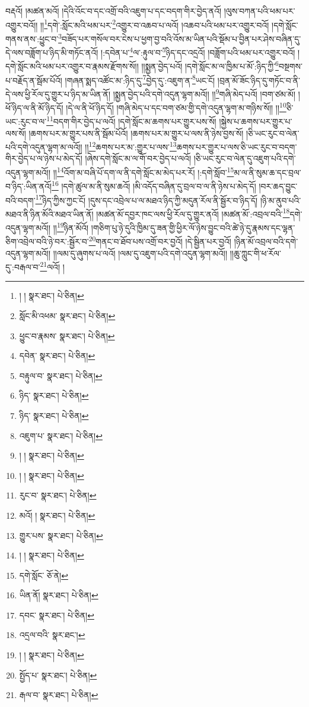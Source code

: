 བརྡའོ། །མཚན་མའོ། །དེའི་འོང་བ་དང་འགྲོ་བའི་འཇུག་པ་དང་བདག་གིར་བྱེད་ནའོ། །ལུས་བཀན་པའི་ཕམ་པར་འགྱུར་བའོ།། །།\footnote{། །  སྣར་ཐང་།  པེ་ཅིན། }དགེ་:སློང་མའི་ཕམ་པར་\footnote{སློང་མི་འཕམ་  སྣར་ཐང་།  པེ་ཅིན། }འགྱུར་བ་འཆབ་པ་ལའོ། །འཆབ་པའི་ཕམ་པར་འགྱུར་བའོ། །དགེ་སློང་གནས་ནས་:ཕྱུང་བ་\footnote{ཕྱུང་བ་རྣམས་  སྣར་ཐང་།  པེ་ཅིན། }བཟོད་པར་གསོལ་བར་ངེས་པ་ཕྱག་བྱ་བའི་འོས་མ་ཡིན་པའི་སྡོམ་པ་བྱིན་པར་ཤེས་བཞིན་དུ་དེ་ལས་བཟློག་པ་ཉིད་མི་གཏོང་ནའོ། །:དབེན་པ་\footnote{དབེན་  སྣར་ཐང་།  པེ་ཅིན། }ལ་:རྟུལ་བ་\footnote{བརྟུལ་བ་  སྣར་ཐང་།  པེ་ཅིན། }ཉིད་དང་འདྲའོ། །བཟློག་པའི་ཕམ་པར་འགྱུར་བའོ། །དགེ་སློང་མའི་ཕམ་པར་འགྱུར་བ་རྣམས་རྫོགས་སོ།། །།སྨྱན་བྱེད་པའོ། །དགེ་སློང་མ་ལ་ཁྱིམ་པ་མོ་:ཉིད་ཀྱི་\footnote{ཉིད་  སྣར་ཐང་།  པེ་ཅིན། }བསྔགས་པ་བརྗོད་ན་སྦོམ་པོའོ། །གཞན་སྨད་འཚོང་མ་:ཉིད་དུ་\footnote{ཉིད་  སྣར་ཐང་།  པེ་ཅིན། }བྱེད་དུ་:འཇུག་ན་\footnote{འཇུག་པ་  སྣར་ཐང་།  པེ་ཅིན། }ཡང་ངོ། །བྲན་མོ་ཟོང་ཉིད་དུ་གཏོང་བ་ནི་དེ་ལས་ཕྱི་རོལ་དུ་གྱུར་པ་ཉིད་མ་ཡིན་ནོ། །སྨྱན་བྱེད་པའི་དགེ་འདུན་ལྷག་མའོ།། །།\footnote{། །  སྣར་ཐང་།  པེ་ཅིན། }གཞི་མེད་པའོ། །བག་ཙམ་མོ། །ཕོ་ཉིད་ལ་ནི་མོ་ཉིད་དོ། །དེ་ལ་ནི་ཕོ་ཉིད་དོ། །གཞི་མེད་པ་དང་བག་ཙམ་གྱི་དགེ་འདུན་ལྷག་མ་གཉིས་སོ།། །།\footnote{། །  སྣར་ཐང་།  པེ་ཅིན། }ཅི་ཡང་:རུང་བ་ལ་\footnote{རུང་བ་  སྣར་ཐང་།  པེ་ཅིན། }བདག་གིར་བྱེད་པ་ལའོ། །དགེ་སློང་མ་ཆགས་པར་གྱུར་པས་སོ། །སྐྱེས་པ་ཆགས་པར་གྱུར་པ་ལས་སོ། །ཆགས་པར་མ་གྱུར་པས་ནི་སྦོམ་པོའོ། །ཆགས་པར་མ་གྱུར་པ་ལས་ནི་ཉེས་བྱས་སོ། །ཅི་ཡང་རུང་བ་ལེན་པའི་དགེ་འདུན་ལྷག་མ་ལའོ།། །།\footnote{མའོ། །  སྣར་ཐང་།  པེ་ཅིན། }ཆགས་པར་མ་:གྱུར་པ་ལས་\footnote{གྱུར་པས་  སྣར་ཐང་།  པེ་ཅིན། }ཆགས་པར་གྱུར་པ་ལས་ཅི་ཡང་རུང་བ་བདག་གིར་བྱེད་པ་ལ་ཉེས་པ་མེད་དོ། །ཞེས་དགེ་སློང་མ་ལ་གོ་བར་བྱེད་པ་ལའོ། །ཅི་ཡང་རུང་བ་ལེན་དུ་འཇུག་པའི་དགེ་འདུན་ལྷག་མའོ།། །།\footnote{། །  སྣར་ཐང་།  པེ་ཅིན། }འོག་མ་བཞི་པོ་དག་ལ་ནི་དགེ་སློང་མ་མེད་པར་རོ། །:དགེ་སློབ་\footnote{དགེ་སློང་  ཅོ་ནེ། }མ་ལ་ནི་སུམ་ཆ་དང་བྲལ་བ་ཉིད་:ཡིན་ནའོ།\footnote{ཡིན་ནོ།  སྣར་ཐང་།  པེ་ཅིན། } །དགེ་ཚུལ་མ་ནི་སུམ་ཆའོ། །མི་འདོད་བཞིན་དུ་བྲལ་བ་ལ་ནི་ཉེས་པ་མེད་དོ། །བར་ཆད་བྱུང་བའི་བདག་\footnote{དབང་  སྣར་ཐང་།  པེ་ཅིན། }ཉིད་ཀྱིས་ཀྱང་ངོ། །དུས་དང་འབྲེལ་པ་ལ་མཐའ་ཉིད་ཀྱི་མདུན་རོལ་ནི་སྦྱོར་བ་ཉིད་དོ། །ཉི་མ་ནུབ་པའི་མཐའ་ནི་ཉིན་མོའི་མཐའ་ཡིན་ནོ། །མཚན་མོ་དབྱར་ཁང་ལས་ཕྱི་རོལ་དུ་གྱུར་ནའོ། །མཚན་མོ་:འབྲལ་བའི་\footnote{འདྲལ་བའི་  སྣར་ཐང་། }དགེ་འདུན་ལྷག་མའོ།། །།\footnote{། །  སྣར་ཐང་།  པེ་ཅིན། }ཉིན་མོའོ། །གཅིག་པུ་ཉེ་དུའི་ཁྱིམ་དུ་ཟན་གྱི་ཕྱིར་ལོ་ཉེས་བྱུང་བའི་ཚེ་ཉེ་དུ་རྣམས་དང་ལྷན་ཅིག་འབྲེལ་བའི་ཉེ་བར་:སྦྱོར་བ་\footnote{སྤྱོད་པ་  སྣར་ཐང་།  པེ་ཅིན། }གནང་བ་ཐོབ་པས་འགྲོ་བར་བྱའོ། །དེ་སྦྱིན་པར་བྱའོ། །ཉིན་མོ་འབྲལ་བའི་དགེ་འདུན་ལྷག་མའོ།། །།ལམ་དུ་ཞུགས་པ་ལའོ། །ལམ་དུ་འཇུག་པའི་དགེ་འདུན་ལྷག་མའོ།། །།ཆུ་ཀླུང་གི་ཕ་རོལ་དུ་:བརྒལ་བ་\footnote{རྒལ་བ་  སྣར་ཐང་།  པེ་ཅིན། }ལའོ། །
